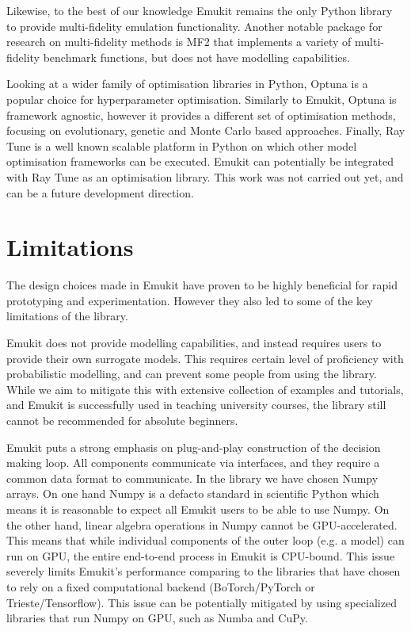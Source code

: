 Likewise, to the best of our knowledge Emukit remains the only Python library to provide multi-fidelity emulation functionality. Another notable package for research on multi-fidelity methods is MF2 \cite{vanRijn2020} that implements a variety of multi-fidelity benchmark functions, but does not have modelling capabilities.

Looking at a wider family of optimisation libraries in Python, Optuna \cite{optuna_2019} is a popular choice for hyperparameter optimisation. Similarly to Emukit, Optuna is framework agnostic, however it provides a different set of optimisation methods, focusing on evolutionary, genetic and Monte Carlo based approaches. Finally, Ray Tune \cite{liaw2018tune} is a well known scalable platform in Python on which other model optimisation frameworks can be executed. Emukit can potentially be integrated with Ray Tune as an optimisation library. This work was not carried out yet, and can be a future development direction.




\section{Limitations}\label{section:limitations}
The design choices made in Emukit have proven to be highly beneficial for rapid prototyping and experimentation. However they also led to some of the key limitations of the library.

Emukit does not provide modelling capabilities, and instead requires users to provide their own surrogate models. This requires certain level of proficiency with probabilistic modelling, and can prevent some people from using the library. While we aim to mitigate this with extensive collection of examples and tutorials, and Emukit is successfully used in teaching university courses, the library still cannot be recommended for absolute beginners.

Emukit puts a strong emphasis on plug-and-play construction of the decision making loop. All components communicate via interfaces, and they require a common data format to communicate. In the library we have chosen Numpy arrays. On one hand Numpy is a defacto standard in scientific Python which means it is reasonable to expect all Emukit users to be able to use Numpy. On the other hand, linear algebra operations in Numpy cannot be GPU-accelerated. This means that while individual components of the outer loop  (e.g. a model) can run on GPU, the entire end-to-end process in Emukit is CPU-bound. This issue severely limits Emukit's performance comparing to the libraries that have chosen to rely on a fixed computational backend (BoTorch/PyTorch or Trieste/Tensorflow). This issue can be potentially mitigated by using specialized libraries that run Numpy on GPU, such as Numba and CuPy.

